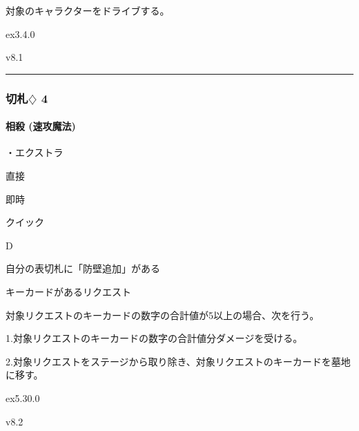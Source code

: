 \documentclass[letterpaper,10pt,dvipdfmx]{sphinxmanual}
\begin{document}
\sphinxAtStartPar
{}

\sphinxAtStartPar
対象のキャラクターをドライブする。

\sphinxAtStartPar
{}  ex3.4.0

\sphinxAtStartPar
{}  v8.1


\bigskip\hrule\bigskip



\subsubsection{切札{\normalsize $\diamondsuit$} 4}
\label{\detokenize{auto/frameActionlist:id55}}

\paragraph{相殺 (速攻魔法)}
\label{\detokenize{auto/frameActionlist:act-reckoning}}\label{\detokenize{auto/frameActionlist:id56}}
\sphinxAtStartPar
{}

\sphinxAtStartPar
・エクストラ

\sphinxAtStartPar
{} 直接

\sphinxAtStartPar
{} 即時

\sphinxAtStartPar
{} クイック

\sphinxAtStartPar
{} D

\sphinxAtStartPar
{}

\sphinxAtStartPar
自分の表切札に「防壁追加」がある

\sphinxAtStartPar
{}

\sphinxAtStartPar
キーカードがあるリクエスト

\sphinxAtStartPar
{}

\sphinxAtStartPar
対象リクエストのキーカードの数字の合計値が5以上の場合、次を行う。

\sphinxAtStartPar
1.対象リクエストのキーカードの数字の合計値分ダメージを受ける。

\sphinxAtStartPar
2.対象リクエストをステージから取り除き、対象リクエストのキーカードを墓地に移す。

\sphinxAtStartPar
{}  ex5.30.0

\sphinxAtStartPar
{}  v8.2
\end{document}
